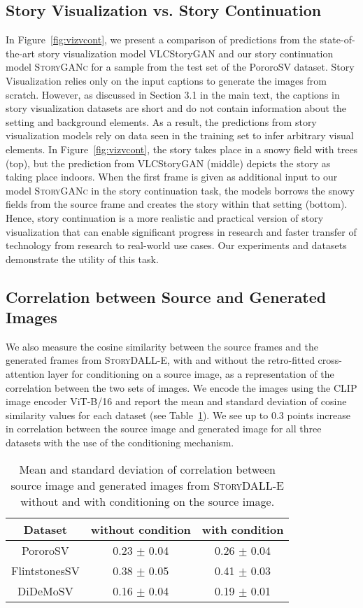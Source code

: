 \documentclass[runningheads]{llncs}
\newcommand{\sdalle}[1]{\textsc{StoryDALL-E}}
\newcommand{\sgan}[1]{\textsc{StoryGANc}}
\begin{document}
\subsection{Story Visualization vs. Story Continuation}
In Figure~\ref{fig:vizvcont}, we present a comparison of predictions from the state-of-the-art story visualization model VLCStoryGAN \cite{maharana2021integrating} and our story continuation model \sgan{} for a sample from the test set of the PororoSV dataset. Story Visualization relies only on the input captions to generate the images from scratch. However, as discussed in Section 3.1 in the main text, the captions in story visualization datasets are short and do not contain information about the setting and background elements. As a result, the predictions from story visualization models rely on data seen in the training set to infer arbitrary visual elements. In Figure~\ref{fig:vizvcont}, the story takes place in a snowy field with trees (top), but the prediction from VLCStoryGAN (middle) depicts the story as taking place indoors. When the first frame is given as additional input to our model \sgan{} in the story continuation task, the models borrows the snowy fields from the source frame and creates the story within that setting (bottom). Hence, story continuation is a more realistic and practical version of story visualization that can enable significant progress in research and faster transfer of technology from research to real-world use cases. Our experiments and datasets demonstrate the utility of this task.

\subsection{Correlation between Source and Generated Images}

We also measure the cosine similarity between the source frames and the generated frames from \sdalle{}, with and without the retro-fitted cross-attention layer for conditioning on a source image, as a representation of the correlation between the two sets of images. We encode the images using the CLIP image encoder ViT-B/16 and report the mean and standard deviation of cosine similarity values for each dataset (see Table~\ref{tab:correlation}). We see up to 0.3 points increase in correlation between the source image and generated image for all three datasets with the use of the conditioning mechanism.

\begin{table}[h]
\centering
\caption{\label{tab:correlation} Mean and standard deviation of correlation between source image and generated images from \sdalle{} without and with conditioning on the source image.}
\begin{tabular}{ |c|c|c| } 
\hline
\textbf{Dataset} & \textbf{without condition} & \textbf{with condition}\\ 
\hline
PororoSV & 0.23 $\pm$ 0.04 & 0.26 $\pm$ 0.04 \\
FlintstonesSV  & 0.38 $\pm$ 0.05 & 0.41 $\pm$ 0.03\\
DiDeMoSV & 0.16 $\pm$ 0.04 & 0.19 $\pm$ 0.01\\
\hline
\end{tabular}
\end{table}
\end{document}
